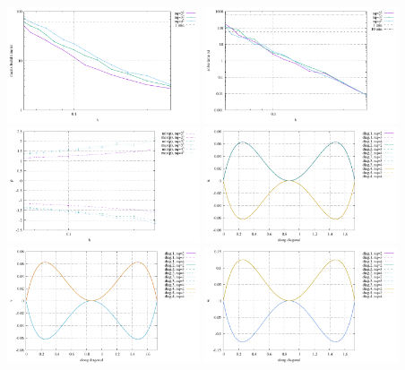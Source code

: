 \begin{center}
\includegraphics[width=5.7cm]{python_codes/fieldstone_82/RESULTS/bench5/build.pdf}
\includegraphics[width=5.7cm]{python_codes/fieldstone_82/RESULTS/bench5/solve.pdf}
\includegraphics[width=5.7cm]{python_codes/fieldstone_82/RESULTS/bench5/p.pdf}
\includegraphics[width=5.7cm]{python_codes/fieldstone_82/RESULTS/bench5/diags_u.pdf}
\includegraphics[width=5.7cm]{python_codes/fieldstone_82/RESULTS/bench5/diags_v.pdf}
\includegraphics[width=5.7cm]{python_codes/fieldstone_82/RESULTS/bench5/diags_w.pdf}\\

\end{center}
